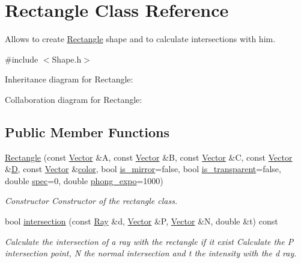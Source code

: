 \hypertarget{classRectangle}{}\section{Rectangle Class Reference}
\label{classRectangle}


Allows to create \hyperlink{classRectangle}{Rectangle} shape and to calculate intersections with him.  




{\ttfamily \#include $<$Shape.\+h$>$}



Inheritance diagram for Rectangle\+:


Collaboration diagram for Rectangle\+:
\subsection*{Public Member Functions}
\begin{DoxyCompactItemize}
\item 
\hyperlink{classRectangle_a8542be11e2dbec207af3f34f693b754c}{Rectangle} (const \hyperlink{classVector}{Vector} \&A, const \hyperlink{classVector}{Vector} \&B, const \hyperlink{classVector}{Vector} \&C, const \hyperlink{classVector}{Vector} \&\hyperlink{classRectangle_aef4ddf913d9986dd8f9c8ead043dacc1}{D}, const \hyperlink{classVector}{Vector} \&\hyperlink{classShape_adb97857c268315aed7861e5204c2485b}{color}, bool \hyperlink{classShape_a0ead7657fa5e4c7862fe1cedd670a9e5}{is\+\_\+mirror}=false, bool \hyperlink{classShape_ab8da3fc4606e66dea941ec23d25f53ef}{is\+\_\+transparent}=false, double \hyperlink{classShape_a60ef96ac5dea3478fdd1ab320e4c3bef}{spec}=0, double \hyperlink{classShape_a2556fca106f9503e6dfb4da703c28f7f}{phong\+\_\+expo}=1000)
\begin{DoxyCompactList}\small\item\em Constructor Constructor of the rectangle class. \end{DoxyCompactList}\item 
bool \hyperlink{classRectangle_a423b89ddb4be31c3ff22a86dcf076b08}{intersection} (const \hyperlink{classRay}{Ray} \&d, \hyperlink{classVector}{Vector} \&P, \hyperlink{classVector}{Vector} \&N, double \&t) const
\begin{DoxyCompactList}\small\item\em Calculate the intersection of a ray with the rectangle if it exist Calculate the P intersection point, N the normal intersection and t the intensity with the d ray. \end{DoxyCompactList}\end{DoxyCompactItemize}

